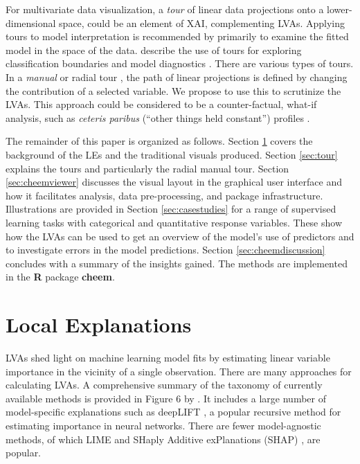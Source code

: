 \documentclass[
]{sn-jnl}
\begin{document}
For multivariate data visualization, a \emph{tour}
\citep{asimov_grand_1985, buja_grand_1986, lee_state_2021} of linear
data projections onto a lower-dimensional space, could be an element of
XAI, complementing LVAs. Applying tours to model interpretation is
recommended by \citet{wickham_visualizing_2015} primarily to examine the
fitted model in the space of the data. \citet{cook_interactive_2007}
describe the use of tours for exploring classification boundaries and
model diagnostics
\citep{Caragea2008, lee_pptree_2013, da_silva_projection_2021}. There
are various types of tours. In a \emph{manual} or radial tour
\citep{cook_manual_1997, spyrison_spinifex_2020}, the path of linear
projections is defined by changing the contribution of a selected
variable. We propose to use this to scrutinize the LVAs. This approach
could be considered to be a counter-factual, what-if analysis, such as
\emph{ceteris paribus} (``other things held constant'') profiles
\citep{biecek_ceterisparibus_2020}.

The remainder of this paper is organized as follows. Section
\ref{sec:explanations} covers the background of the LEs and the
traditional visuals produced. Section \ref{sec:tour} explains the tours
and particularly the radial manual tour. Section \ref{sec:cheemviewer}
discusses the visual layout in the graphical user interface and how it
facilitates analysis, data pre-processing, and package infrastructure.
Illustrations are provided in Section \ref{sec:casestudies} for a range
of supervised learning tasks with categorical and quantitative response
variables. These show how the LVAs can be used to get an overview of the
model's use of predictors and to investigate errors in the model
predictions. Section \ref{sec:cheemdiscussion} concludes with a summary
of the insights gained. The methods are implemented in the \textbf{R}
package \textbf{cheem}.

\hypertarget{sec:explanations}{%
\section{Local Explanations}\label{sec:explanations}}

LVAs shed light on machine learning model fits by estimating linear
variable importance in the vicinity of a single observation. There are
many approaches for calculating LVAs. A comprehensive summary of the
taxonomy of currently available methods is provided in Figure 6 by
\citet{arrieta_explainable_2020}. It includes a large number of
model-specific explanations such as deepLIFT
\citep{shrikumar_not_2016, shrikumar_learning_2017}, a popular recursive
method for estimating importance in neural networks. There are fewer
model-agnostic methods, of which LIME \citep{ribeiro_why_2016} and
SHaply Additive exPlanations (SHAP) \citep{lundberg_unified_2017}, are
popular.
\end{document}
